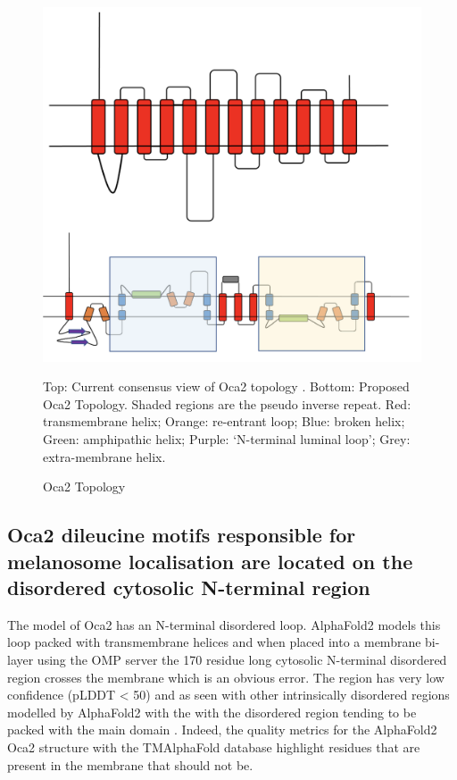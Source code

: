 \begin{figure}[th!]
    \centering
    \includegraphics[width=150mm, scale=0.75]{oca2/oca2_4.png}
    \caption{Oca2 Topology}
    \label{fig:oca2_4}
    \small
    Top: Current consensus view of Oca2 topology \cite{sitaram2009localization}. Bottom: Proposed Oca2 Topology. Shaded regions are the pseudo inverse repeat. Red: transmembrane helix; Orange: re-entrant loop; Blue: broken helix; Green: amphipathic helix; Purple: ‘N-terminal luminal loop’; Grey: extra-membrane helix.
\end{figure}


\subsection{Oca2 dileucine motifs responsible for melanosome localisation are located on the disordered cytosolic N-terminal region}
The model of Oca2 has an N-terminal disordered loop. AlphaFold2 models this loop packed with transmembrane helices and when placed into a membrane bi-layer using the OMP server the 170 residue long cytosolic N-terminal disordered region crosses the membrane which is an obvious error. The region has very low confidence (pLDDT < 50) and as seen with other intrinsically disordered regions modelled by AlphaFold2 with the with the disordered region tending to be packed with the main domain \cite{ruff2021alphafold}.  Indeed, the quality metrics for the AlphaFold2 Oca2 structure with the TMAlphaFold database highlight residues that are present in the membrane that should not be.

